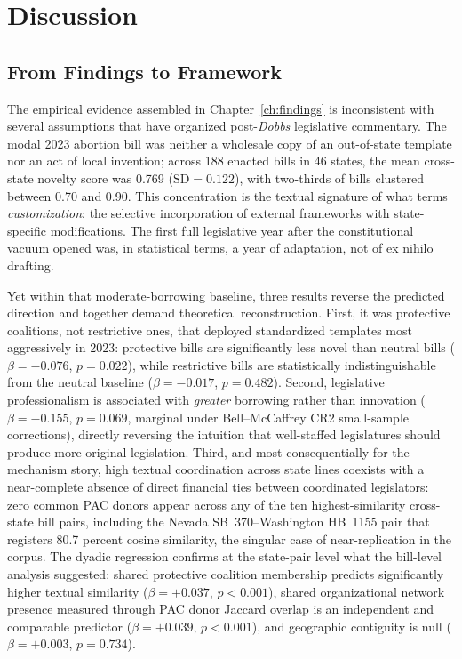 \chapter{Discussion}
\label{ch:discussion}
 
\section{From Findings to Framework}
\label{sec:disc_intro}

The empirical evidence assembled in Chapter~\ref{ch:findings} is inconsistent with several assumptions that have organized post-\textit{Dobbs} legislative commentary. The modal 2023 abortion bill was neither a wholesale copy of an out-of-state template nor an act of local invention; across 188 enacted bills in 46 states, the mean cross-state novelty score was 0.769 ($\text{SD} = 0.122$), with two-thirds of bills clustered between 0.70 and 0.90. This concentration is the textual signature of what \textcite{karchDemocraticLaboratories2007} terms \emph{customization}: the selective incorporation of external frameworks with state-specific modifications. The first full legislative year after the constitutional vacuum opened was, in statistical terms, a year of adaptation, not of ex nihilo drafting.

Yet within that moderate-borrowing baseline, three results reverse the predicted direction and together demand theoretical reconstruction. First, it was protective coalitions, not restrictive ones, that deployed standardized templates most aggressively in 2023: protective bills are significantly less novel than neutral bills ($\beta = -0.076$, $p = 0.022$), while restrictive bills are statistically indistinguishable from the neutral baseline ($\beta = -0.017$, $p = 0.482$). Second, legislative professionalism is associated with \emph{greater} borrowing rather than innovation ($\beta = -0.155$, $p = 0.069$, marginal under Bell--McCaffrey CR2 small-sample corrections), directly reversing the intuition that well-staffed legislatures should produce more original legislation. Third, and most consequentially for the mechanism story, high textual coordination across state lines coexists with a near-complete absence of direct financial ties between coordinated legislators: zero common PAC donors appear across any of the ten highest-similarity cross-state bill pairs, including the Nevada SB~370--Washington HB~1155 pair that registers 80.7 percent cosine similarity, the singular case of near-replication in the corpus. The dyadic regression confirms at the state-pair level what the bill-level analysis suggested: shared protective coalition membership predicts significantly higher textual similarity ($\beta = +0.037$, $p < 0.001$), shared organizational network presence measured through PAC donor Jaccard overlap is an independent and comparable predictor ($\beta = +0.039$, $p < 0.001$), and geographic contiguity is null ($\beta = +0.003$, $p = 0.734$).

